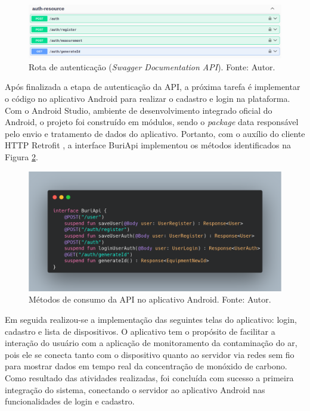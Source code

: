 \begin{figure}[ht]
    \centering
    \includegraphics[width=.74\textwidth]{img/swagger-auth-resource.png}
    \caption{Rota de autenticação (\textit{Swagger Documentation API}). Fonte: Autor.}\label{figSwaggerAut}
\end{figure}

Após finalizada a etapa de autenticação da API, a próxima tarefa é implementar o código no aplicativo Android 
para realizar o cadastro e login na plataforma. Com o Android Studio, ambiente de desenvolvimento integrado oficial do Android, o projeto 
foi construído em módulos, sendo o \textit{package} data responsável pelo envio e tratamento de dados do aplicativo. Portanto, com o auxílio do cliente HTTP Retrofit \cite{retrofit}, 
a interface BuriApi implementou os métodos identificados na Figura \ref{figRetrofitAndroid}.

\begin{figure}[ht]
    \centering
    \includegraphics[width=.74\textwidth]{img/retrofit-buri-api-auth.png}
    \caption{Métodos de consumo da API no aplicativo Android. Fonte: Autor.}\label{figRetrofitAndroid}
\end{figure}

Em seguida realizou-se a implementação das seguintes telas do aplicativo: login, cadastro e lista de dispositivos. O aplicativo 
tem o propósito de facilitar a interação do usuário com a aplicação de monitoramento da contaminação do ar, pois ele se conecta 
tanto com o dispositivo quanto ao servidor via redes sem fio para mostrar dados em tempo real da concentração de monóxido de carbono. Como resultado das 
atividades realizadas, foi concluída com sucesso a primeira integração do sistema, conectando o servidor ao aplicativo Android nas 
funcionalidades de login e cadastro. 

